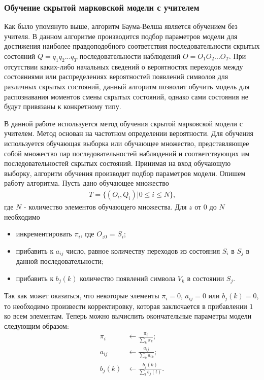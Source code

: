 \subsubsection{Обучение скрытой марковской модели с учителем}
Как было упомянуто выше, алгоритм Баума-Велша является обучением без учителя. В данном алгоритме производится подбор параметров модели для достижения наиболее правдоподобного соответствия последовательности скрытых состояний \(Q=q_1q_2...q_T\) последовательности наблюдений \(O=O_1O_2...O_T\). При отсутствии каких-либо начальных сведений о вероятностях переходов между состояниями или распределениях вероятностей появлений символов для различных скрытых состояний, данный алгоритм позволит обучить модель для распознавания моментов смены скрытых состояний, однако сами состояния не будут привязаны к конкретному типу.

В данной работе используется метод обучения скрытой марковской модели с учителем. Метод основан на частотном определении вероятности. Для обучения используется обучающая выборка или обучающее множество, представляющее собой множество пар последовательностей наблюдений и соответствующих им последовательностей скрытых состояний. Принимая на вход обучающую выборку, алгоритм обучения производит подбор параметров модели. Опишем работу алгоритма. Пусть дано обучающее множество
\begin{align}
T = \{(O_i, Q_i) | 0 \le i \le N\} \text{,}
\end{align}
где \(N\) - количество элементов обучающего множества. Для \(z\) от \(0\) до \(N\) необходимо
\begin{itemize}
\item
инкрементировать \(\pi_i\), где \(O_{z0}\) = \(S_i\);
\item
прибавить к \(a_{ij}\) число, равное количеству переходов из состояния \(S_i\) в \(S_j\) в данной последовательности;
\item
прибавить к \(b_j(k)\) количество появлений символа \(V_k\) в состоянии \(S_j\).
\end{itemize}
Так как может оказаться, что некоторые элементы \(\pi_i = 0\), \(a_{ij} = 0\) или \(b_j(k) = 0\), то необходимо произвести корректировку, которая заключается в прибавлении \(1\) ко всем элементам.
Теперь можно вычислить окончательные параметры модели следующим образом:
\begin{align}
	\pi_i &\leftarrow \frac{\pi_i}{\displaystyle\sum_{k} \pi_k}; \\
	a_{ij} &\leftarrow \frac{a_{ij}}{\displaystyle\sum_{k} a_{ik}}; \\
	b_j(k) &\leftarrow \frac{b_j(k)}{\displaystyle\sum_{t} b_j(t)}.
\end{align}

